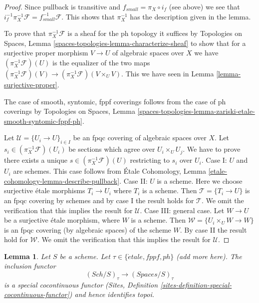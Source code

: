 \documentclass{stacks-project}
\theoremstyle{plain}
\newtheorem{lemma}[subsection]{Lemma}
\theoremstyle{definition}
\theoremstyle{remark}
\numberwithin{equation}{subsection}
\def\Sch{\mathit{Sch}}
\def\etale{{\acute{e}tale}}
\begin{document}
\begin{proof}
Since pullback is transitive and $f_{small} = \pi_X \circ i_f$
(see above) we see that
$i_f^{-1} \pi_X^{-1}\mathcal{F} = f_{small}^{-1}\mathcal{F}$.
This shows that $\pi_X^{-1}$ has the description given in the lemma.

\medskip\noindent
To prove that $\pi_X^{-1}\mathcal{F}$ is a sheaf for the ph topology
it suffices by Topologies on Spaces, Lemma
\ref{spaces-topologies-lemma-characterize-sheaf}
to show that for a surjective proper morphism
$V \to U$ of algebraic spaces over $X$ we have
$(\pi_X^{-1}\mathcal{F})(U)$ is the equalizer of the two maps
$(\pi_X^{-1}\mathcal{F})(V) \to (\pi_X^{-1}\mathcal{F})(V \times_U V)$.
This we have seen in Lemma \ref{lemma-surjective-proper}.

\medskip\noindent
The case of smooth, syntomic, fppf coverings follows from the case
of ph coverings by Topologies on Spaces, Lemma
\ref{spaces-topologies-lemma-zariski-etale-smooth-syntomic-fppf-ph}.

\medskip\noindent
Let $\mathcal{U} = \{U_i \to U\}_{i \in I}$ be an fpqc covering of algebraic
spaces over $X$. Let $s_i \in (\pi_X^{-1}\mathcal{F})(U_i)$ be sections
which agree over $U_i \times_U U_j$. We have to prove there exists a unique
$s \in (\pi_X^{-1}\mathcal{F})(U)$ restricting to $s_i$ over $U_i$.
Case I: $U$ and $U_i$ are schemes. This case follows from
\'Etale Cohomology, Lemma \ref{etale-cohomology-lemma-describe-pullback}.
Case II: $U$ is a scheme. Here we choose surjective \'etale morphisms
$T_i \to U_i$ where $T_i$ is a scheme. Then $\mathcal{T} = \{T_i \to U\}$ is an
fpqc covering by schemes and by case I the result holds for $\mathcal{T}$.
We omit the verification that this implies the result for $\mathcal{U}$.
Case III: general case. Let $W \to U$ be a surjective \'etale
morphism, where $W$ is a scheme. Then $\mathcal{W} = \{U_i \times_U W \to W\}$
is an fpqc covering (by algebraic spaces) of the scheme $W$.
By case II the result hold for $\mathcal{W}$.
We omit the verification that this implies the result for $\mathcal{U}$.
\end{proof}

\begin{lemma}
\label{lemma-compare-cohomology-other-topologies}
Let $S$ be a scheme. Let $\tau \in \{\etale, fppf, ph\}$ (add more here).
The inclusion functor
$$
(\Sch/S)_\tau \longrightarrow (\textit{Spaces}/S)_\tau
$$
is a special cocontinuous functor
(Sites, Definition \ref{sites-definition-special-cocontinuous-functor})
and hence identifies topoi.
\end{lemma}
\end{document}
